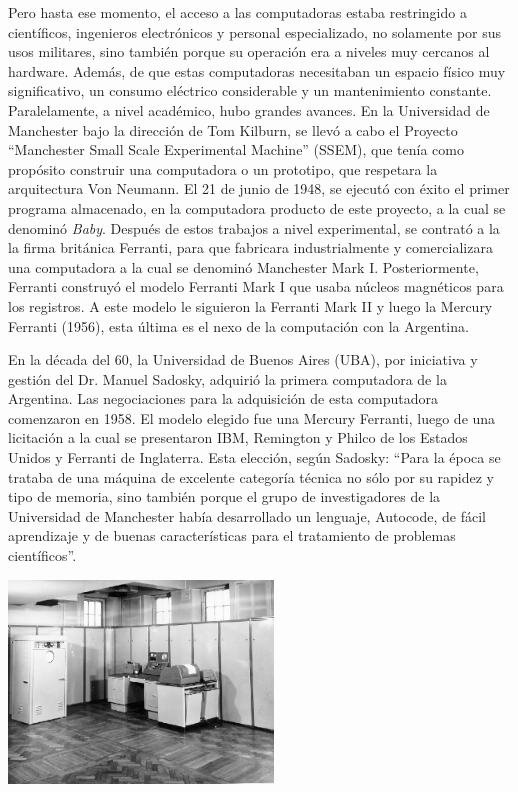 \documentclass[%
 	final,
%
	notitlepage,
	narroweqnarray,
	inline,
 	twoside,
	]{ieee}
\begin{document}
Pero hasta ese momento, el acceso a las computadoras estaba restringido a cient\'ificos, ingenieros electr\'onicos y personal especializado, no solamente por sus usos militares, sino tambi\'en porque su operaci\'on era a niveles muy cercanos al hardware. Adem\'as, de que estas computadoras necesitaban un espacio f\'isico muy significativo, un consumo el\'ectrico considerable y un mantenimiento constante.
Paralelamente, a nivel acad\'emico, hubo grandes avances. En la Universidad de Manchester bajo la direcci\'on de Tom Kilburn, se llev\'o a cabo el Proyecto “Manchester Small Scale Experimental Machine” (SSEM), que ten\'ia como prop\'osito construir una computadora o un prototipo, que respetara la arquitectura Von Neumann. El 21 de junio de 1948, se ejecut\'o con \'exito el primer programa almacenado, en la computadora producto de este proyecto, a la cual se denomin\'o \textit{Baby}.
Despu\'es de estos trabajos a nivel experimental, se contrat\'o a la la firma brit\'anica Ferranti\cite{ferranti}, para que fabricara industrialmente y comercializara una computadora a la cual se denomin\'o Manchester Mark I\cite{mark1}.
Posteriormente, Ferranti construy\'o el modelo Ferranti Mark I que usaba n\'ucleos magn\'eticos para los registros. A este modelo le siguieron la Ferranti Mark II y luego la Mercury Ferranti (1956), esta \'ultima es el nexo de la computaci\'on con la Argentina.

En la d\'ecada del 60, la Universidad de Buenos Aires (UBA), por iniciativa y gesti\'on del Dr. Manuel Sadosky\cite{sadosky}, adquiri\'o la primera computadora de la Argentina.
Las negociaciones para la adquisici\'on de esta computadora comenzaron en 1958. El modelo elegido fue una Mercury Ferranti, luego de una licitaci\'on a la cual se presentaron IBM, Remington y Philco de los Estados Unidos y Ferranti de Inglaterra. Esta elecci\'on, seg\'un Sadosky: ``Para la \'epoca se trataba de una m\'aquina de excelente categor\'ia t\'ecnica no s\'olo por su rapidez y tipo de memoria, sino tambi\'en porque el grupo de investigadores de la Universidad de Manchester hab\'ia desarrollado un lenguaje, Autocode, de f\'acil aprendizaje y de buenas caracter\'isticas para el tratamiento de problemas cient\'ificos''.

\begin{center}\includegraphics[width=200pt, height=153pt]{clementina.png}\end{center}
\end{document}
